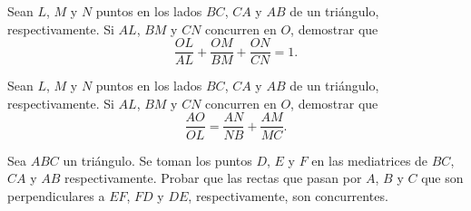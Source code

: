 \begin{section-exercise}
    Sean $L$, $M$ y $N$ puntos en los lados $BC$, $CA$ y $AB$ de un triángulo, respectivamente.
    Si $AL$, $BM$ y $CN$ concurren en $O$, demostrar que
    \[\frac{OL}{AL} + \frac{OM}{BM} + \frac{ON}{CN} = 1.\]
\end{section-exercise}

\begin{section-exercise}
    Sean $L$, $M$ y $N$ puntos en los lados $BC$, $CA$ y $AB$ de un triángulo, respectivamente.
    Si $AL$, $BM$ y $CN$ concurren en $O$, demostrar que
    \[\frac{AO}{OL} = \frac{AN}{NB} + \frac{AM}{MC}.\]
\end{section-exercise}

\begin{section-problem}
    Sea $ABC$ un triángulo.
    Se toman los puntos $D$, $E$ y $F$ en las mediatrices de $BC$, $CA$ y $AB$ respectivamente.
    Probar que las rectas que pasan por $A$, $B$ y $C$ que son perpendiculares a $EF$, $FD$ y $DE$, respectivamente, son concurrentes.
\end{section-problem}
